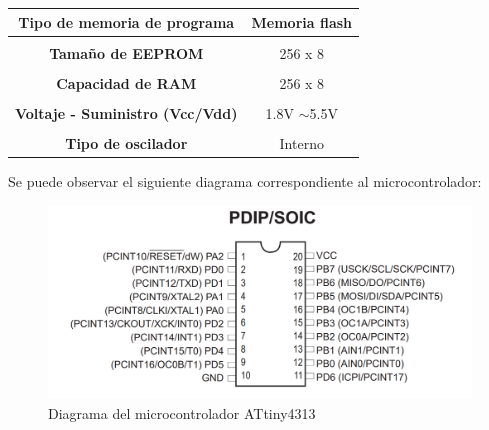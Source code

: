 \documentclass[12pt,letterpaper]{article}
\begin{document}
\begin{table}[H]
\begin{tabular}{|c|c|}
\multirow{-2}{*}{\textbf{Tipo de memoria de programa}}                             & \multirow{-2}{*}{Memoria flash}                               \\ \hline
                                                                                   &                                                               \\
\multirow{-2}{*}{\textbf{Tamaño de EEPROM}}                                        & \multirow{-2}{*}{256 x 8}                                     \\ \hline
                                                                                   &                                                               \\
\multirow{-2}{*}{\textbf{Capacidad de RAM}}                                        & \multirow{-2}{*}{256 x 8}                                     \\ \hline
                                                                                   &                                                               \\
\multirow{-2}{*}{\textbf{Voltaje - Suministro (Vcc/Vdd)}}                          & \multirow{-2}{*}{1.8V $\sim$5.5V}                             \\ \hline
                                                                                   &                                                               \\
\multirow{-2}{*}{\textbf{Tipo de oscilador}}                                       & \multirow{-2}{*}{Interno}                                     \\ \hline
\end{tabular}
\end{table}


\newpage


Se puede observar el siguiente diagrama correspondiente al microcontrolador\cite{Microchip_Technology_2011}:

\begin{figure}[H]
    \centering
    \includegraphics[width=15cm]{Imagenes/diagrama4313.png}
    \caption{Diagrama del microcontrolador ATtiny4313}
    \label{Diagrama del microcontrolador ATtiny4313}
\end{figure}
\end{document}
